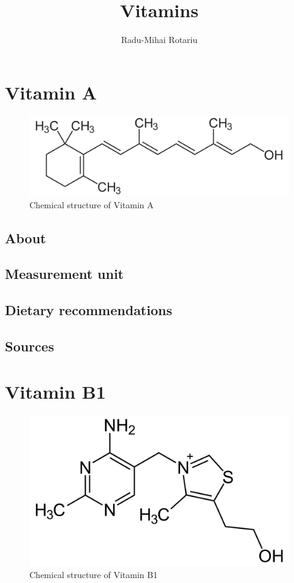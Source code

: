 \documentclass{book}
\begin{document}
\title{Vitamins}
\author{Radu-Mihai Rotariu}
\maketitle

\tableofcontents
\chapter{Vitamin A}
\begin{figure}[h]
	\centering \includegraphics[width=\linewidth]{images/Vitamin_A_chemical_structure}
	\caption{Chemical structure of Vitamin A}
\end{figure}

\section{About}


\section{Measurement unit}


\section{Dietary recommendations}


\section{Sources}


\chapter{Vitamin B1}
\begin{figure}[h]
	\centering \includegraphics[width=0.75\linewidth]{images/Vitamin_B1_chemical_structure}
	\caption{Chemical structure of Vitamin B1}
\end{figure}
\end{document}
